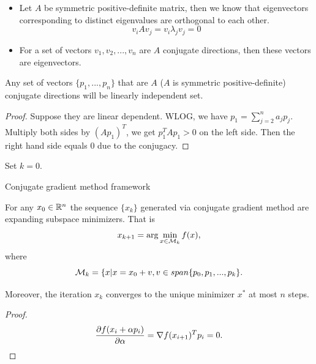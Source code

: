 \begin{refsection}
\begin{remark}\hfill
\begin{itemize}
\item Let $A$ be symmetric positive-definite matrix, then we know that eigenvectors corresponding to distinct eigenvalues are orthogonal to each other. 
		$$v_i Av_j = v_i \lambda_j v_j = 0$$
\item For a set of vectors $v_1,v_2,...,v_n$ are $A$ conjugate directions, then these vectors are eigenvectors. 
\end{itemize}
\end{remark}

\begin{lemma}
Any set of vectors $\{p_1,...,p_n\}$ that are $A$ ($A$ is symmetric positive-definite) conjugate directions will be linearly independent set. 	
\end{lemma}
\begin{proof}
Suppose they are linear dependent. WLOG, we have $p_1 = \sum_{j=2}^n a_jp_j$. Multiply both sides by $(Ap_1)^T$, we get $p_1^TAp_1 > 0$ on the left side. Then the right hand side equals 0 due to the conjugacy. 
\end{proof}




\begin{algorithm}[H]
	\SetAlgoLined
	Set $k = 0$.
	\caption{Conjugate gradient method framework}
\end{algorithm}

\begin{lemma}\cite[103]{nocedal2006numerical}\cite[121]{bertsekas2016nonlinear}
	For any $x_0\in \mathbb{R}^n$ the sequence $\{x_k\}$ generated via conjugate gradient method are expanding subspace minimizers. That is
	$$x_{k+1} = \arg\min_{x\in \mathcal{M}_k} f(x),$$
where $$\mathcal{M}_k =\{x|x = x_0 + v, v\in span\{p_0,p_1,...,p_k\}.$$

Moreover, the iteration $x_k$ converges to the unique minimizer $x^*$ at most $n$ steps.
\end{lemma}
\begin{proof}
$$\frac{\partial f(x_i + \alpha p_i)}{\partial \alpha} = \nabla f(x_{i+1})^T p_i = 0.$$


\end{proof}
\end{refsection}
